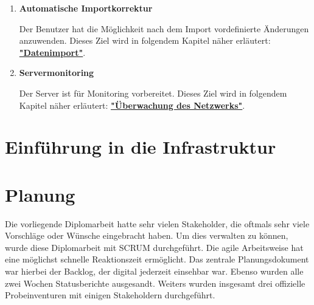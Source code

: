 \documentclass[
    headings=optiontotocandhead,%
    twoside,
    numbers=noenddot,%
    toc=flat, %
    12pt, %
    titlepage, %
    parskip=full, %
    listof=totoc, %
    listof=flat, %
    numbers=noenddot, %
    bibliography=totoc, %
    a4paper,DIV=14,
    BCOR=15mm,
]{scrbook}
\begin{document}
\begin{enumerate}
  \item \textbf{Automatische Importkorrektur}

  Der Benutzer hat die Möglichkeit nach dem Import vordefinierte Änderungen anzuwenden.
  Dieses Ziel wird in folgendem Kapitel näher erläutert: \textbf{\hyperref[datenimport]{"Datenimport"}}.




  \item \textbf{Servermonitoring}

  Der Server ist für Monitoring vorbereitet.
  Dieses Ziel wird in folgendem Kapitel näher erläutert: \textbf{\hyperref[uxfcberwachung-des-netzwerks]{"Überwachung des Netzwerks"}}.
\end{enumerate}



%

\renewcommand{\kapitelautor}{Autor: Josip Domazet}



\renewcommand{\kapitelautor}{Autor: Mathias Möller}



\chapter{Einführung in die Infrastruktur}
\renewcommand{\kapitelautor}{Autor: Hannes Weiss}




\renewcommand{\kapitelautor}{}

\chapter{Planung}

Die vorliegende Diplomarbeit hatte sehr vielen Stakeholder, die oftmals sehr viele Vorschläge oder Wünsche eingebracht haben. Um dies verwalten zu können, wurde diese Diplomarbeit mit SCRUM durchgeführt. Die agile Arbeitsweise hat eine möglichst schnelle Reaktionszeit ermöglicht. Das zentrale Planungsdokument war hierbei der Backlog, der digital jederzeit einsehbar war. Ebenso wurden alle zwei Wochen Statusberichte ausgesandt. Weiters wurden insgesamt drei offizielle Probeinventuren mit einigen Stakeholdern durchgeführt. 
\end{document}
